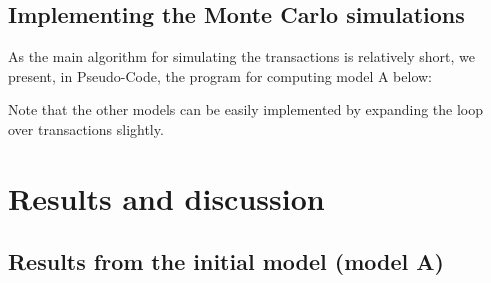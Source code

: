 \documentclass[a4paper, 10pt]{article}
\begin{document}
\subsection{Implementing the Monte Carlo simulations}
As the main algorithm for simulating the transactions is relatively short, we present, in Pseudo-Code, the program for computing model A below:

Note that the other models can be easily implemented by expanding the loop over transactions slightly.
\section{Results and discussion}
\subsection{Results from the initial model (model A)}
\end{document}
